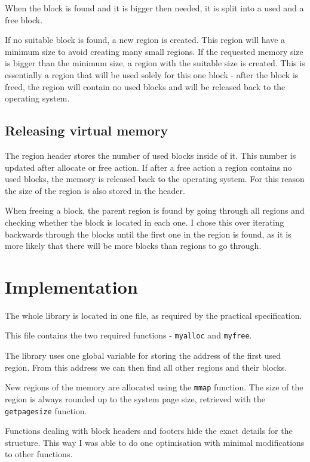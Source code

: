\documentclass{article}
\begin{document}
When the block is found and it is bigger then needed, it is split into a used and a free block.

If no suitable block is found, a new region is created. This region will have a minimum size to avoid creating many small regions. If the requested memory size is bigger than the minimum size, a region with the suitable size is created. This is essentially a region that will be used solely for this one block - after the block is freed, the region will contain no used blocks and will be released back to the operating system.

\subsection{Releasing virtual memory}

The region header stores the number of used blocks inside of it. This number is updated after allocate or free action. If after a free action a region contains no used blocks, the memory is released back to the operating system. For this reason the size of the region is also stored in the header.

When freeing a block, the parent region is found by going through all regions and checking whether the block is located in each one. I chose this over iterating backwards through the blocks until the first one in the region is found, as it is more likely that there will be more blocks than regions to go through.

\section{Implementation}

The whole library is located in one file, as required by the practical specification.

This file contains the two required functions - \lstinline{myalloc} and \lstinline{myfree}.

The library uses one global variable for storing the address of the first used region. From this address we can then find all other regions and their blocks.

New regions of the memory are allocated using the \lstinline{mmap} function. The size of the region is always rounded up to the system page size, retrieved with the \lstinline{getpagesize} function.

Functions dealing with block headers and footers hide the exact details for the structure. This way I was able to do one optimisation with minimal modifications to other functions.
\end{document}
